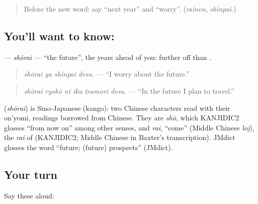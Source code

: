 \label{lesson:JA-C258-shourai}



\begin{quote}
Before the new word: say \textquotedblleft{}next year\textquotedblright{} and \textquotedblleft{}worry\textquotedblright{}. (\emph{rainen}, \emph{shinpai}.)
\end{quote}

\subsection*{You'll want to know: }
\textbf{} — \emph{shōrai} — \textquotedblleft{}the future\textquotedblright{}, the years ahead of you: further off than \textbf{}.

\begin{quote}
\textbf{ }
\end{quote}

\begin{quote}
\emph{shōrai ga shinpai desu.} — \textquotedblleft{}I worry about the future.\textquotedblright{}
\end{quote}

\begin{quote}
\textbf{   }
\end{quote}

\begin{quote}
\emph{shōrai ryokō ni iku tsumori desu.} — \textquotedblleft{}In the future I plan to travel.\textquotedblright{}
\end{quote}

\begin{cousinweb}
\textbf{} (\emph{shōrai}) is Sino-Japanese (kango): two Chinese characters read with their on'yomi, readings borrowed from Chinese. They are \emph{shō}, which KANJIDIC2 glosses \textquotedblleft{}from now on\textquotedblright{} among other senses, and \emph{rai}, \textquotedblleft{}come\textquotedblright{} (Middle Chinese \emph{loj}), the \emph{rai} of \textbf{} (KANJIDIC2; Middle Chinese in Baxter's transcription). JMdict glosses the word \textquotedblleft{}future; (future) prospects\textquotedblright{} (JMdict).
\end{cousinweb}

\subsection*{Your turn}
Say these aloud:

